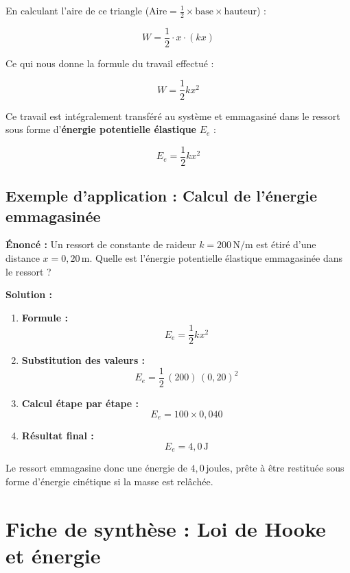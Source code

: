 \documentclass[11pt,openany]{book}
\begin{document}
En calculant l'aire de ce triangle ($\text{Aire} = \frac{1}{2} \times \text{base} \times \text{hauteur}$) :

\[
W = \frac{1}{2} \cdot x \cdot (kx)
\]

Ce qui nous donne la formule du travail effectué :

\[
\boxed{W = \frac{1}{2} k x^2}
\]

\vspace{0.2cm}

Ce travail est intégralement transféré au système et emmagasiné dans le ressort sous forme d'\textbf{énergie potentielle élastique} $E_e$ :

\[
\boxed{E_e = \frac{1}{2} k x^2}
\]

\subsection*{Exemple d'application : Calcul de l'énergie emmagasinée}

\noindent\textbf{Énoncé :} Un ressort de constante de raideur $k = \mathrm{200\,N/m}$ est étiré d'une distance $x = \mathrm{0{,}20\,m}$. Quelle est l'énergie potentielle élastique emmagasinée dans le ressort ?

\vspace{0.2cm}

\noindent\textbf{Solution :}

\begin{enumerate}
    \item \textbf{Formule :} 
    \[
    E_e = \frac{1}{2} k x^2
    \]
    \item \textbf{Substitution des valeurs :}
    \[
    E_e = \frac{1}{2} \, (200) \, (0{,}20)^2
    \]
    \item \textbf{Calcul étape par étape :}
    \[
    E_e = 100 \times 0{,}040
    \]
    \item \textbf{Résultat final :}
    \[
    \boxed{E_e = \mathrm{4{,}0\,J}}
    \]
\end{enumerate}

Le ressort emmagasine donc une énergie de $\mathrm{4{,}0\,\text{joules}}$, prête à être restituée sous forme d'énergie cinétique si la masse est relâchée.
\section{Fiche de synthèse : Loi de Hooke et énergie}
\end{document}
